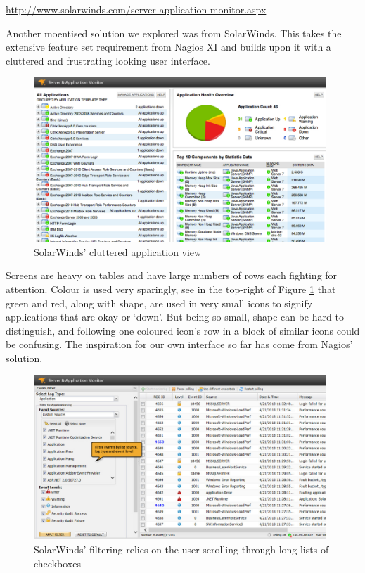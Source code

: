 \documentclass{l3proj}
\begin{document}
\url{http://www.solarwinds.com/server-application-monitor.aspx}

Another moentised solution we explored was from SolarWinds. This takes the extensive feature set requirement from Nagios XI and builds upon it with a cluttered and frustrating looking user interface.

\begin{figure}[H]
\centering
\includegraphics[width=110mm]{Competitors/SolarWinds_AppView.jpg}
\caption{SolarWinds' cluttered application view}
\label{fig:SWAppView}
\end{figure}

Screens are heavy on tables and have large numbers of rows each fighting for attention. Colour is used very sparingly, see in the top-right of Figure \ref{fig:SWAppView} that green and red, along with shape, are used in very small icons to signify applications that are okay or `down'. But being so small, shape can be hard to distinguish, and following one coloured icon's row in a block of similar icons could be confusing. The inspiration for our own interface so far has come from Nagios' solution.

\begin{figure}[H]
\centering
\includegraphics[width=110mm]{Competitors/SolarWinds_EventFiltering.jpg}
\caption{SolarWinds' filtering relies on the user scrolling through long lists of checkboxes}
\label{fig:SWFiltering}
\end{figure}
\end{document}

